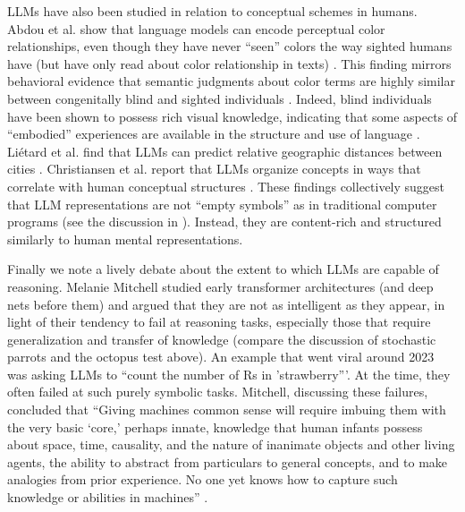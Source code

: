 LLMs have also been studied in relation to conceptual schemes in humans. Abdou
et al. show that language models can encode perceptual color relationships,
even though they have never ``seen'' colors the way sighted humans have (but
have only read about color relationship in texts) \cite{abdou2021can}. This
finding mirrors behavioral evidence that semantic judgments about color terms
are highly similar between congenitally blind and sighted individuals
\cite{marmor1978age, saysani2018colour}. Indeed, blind individuals have been
shown to possess rich visual knowledge, indicating that some aspects of
``embodied'' experiences are available in the structure and use of language
\cite{kim2019knowledge, liu2025learning}. Liétard et al. find that LLMs can
predict relative geographic distances between cities \cite{lietard2021do}.
Christiansen et al. report that LLMs organize concepts in ways that correlate
with human conceptual structures \cite{christiansen2023large}. These findings
collectively suggest that LLM representations are not ``empty symbols'' as in
traditional computer programs (see the discussion in
). Instead, they are content-rich and structured
similarly to human mental representations.

Finally we note a lively debate about the extent to which LLMs are capable of
reasoning. Melanie Mitchell studied early transformer architectures (and deep
nets before them) and argued that they are not as intelligent as they appear,
in light of their tendency to fail at reasoning tasks, especially those that
require generalization and transfer of knowledge (compare the discussion of
stochastic parrots and the octopus test above).  An example that went viral
around 2023 was asking LLMs to  ``count the number of Rs in 'strawberry'''.  At
the time, they often failed at such purely symbolic tasks.  Mitchell,
discussing these failures, concluded that ``Giving machines common sense will
require imbuing them with the very basic `core,' perhaps innate, knowledge that
human infants possess about space, time, causality, and the nature of inanimate
objects and other living agents, the ability to abstract from particulars to
general concepts, and to make analogies from prior experience. No one yet knows
how to capture such knowledge or abilities in machines'' \cite{mitchell2021ai}. 

